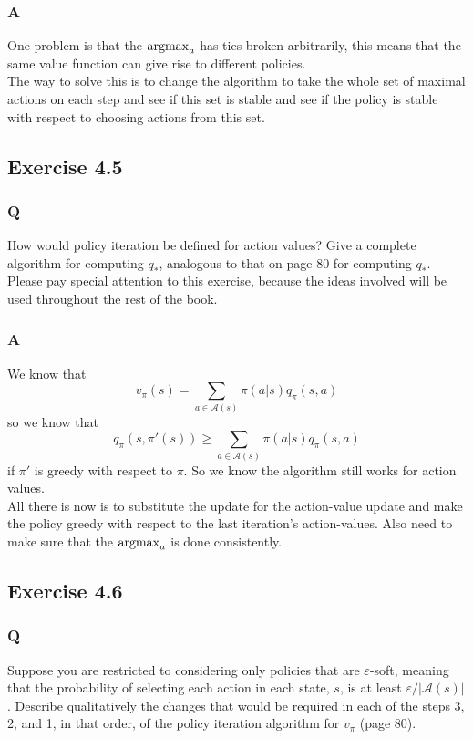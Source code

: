 \subsubsection{A}
One problem is that the $\operatorname*{argmax}_a$ has ties broken arbitrarily, this means that the same value function can give rise to different policies.\\

The way to solve this is to change the algorithm to take the whole set of maximal actions on each step and see if this set is stable and see if the policy is stable with respect to choosing actions from this set.


\subsection{Exercise 4.5}
\subsubsection{Q}
How would policy iteration be defined for action values? Give a complete algorithm for computing $q_*$, analogous to that on page 80 for computing $q_*$. Please pay special attention to this exercise, because the ideas involved will be used throughout the rest of the book.

\subsubsection{A}
We know that
\begin{equation}
    v_\pi(s) = \sum_{a \in \mathcal{A}(s)} \pi(a|s)q_\pi(s, a)
\end{equation}
so we know that
\begin{equation}
    q_\pi(s, \pi'(s)) \geq \sum_{a \in \mathcal{A}(s)} \pi(a|s)q_\pi(s, a)
\end{equation}
if $\pi'$ is greedy with respect to $\pi$. So we know the algorithm still works for action values.\\

All there is now is to substitute the update for the action-value update and make the policy greedy with respect to the last iteration's action-values. Also need to make sure that the $\operatorname*{argmax}_a$ is done consistently.

\subsection{Exercise 4.6}
\subsubsection{Q}
Suppose you are restricted to considering only policies that are $\varepsilon$-soft, meaning that the probability of selecting each action in each state, $s$, is at least $\varepsilon / |\mathcal{A}(s)|$. Describe qualitatively the changes that would be required in each of the steps 3, 2, and 1, in that order, of the policy iteration algorithm for $v_\pi$ (page 80).

